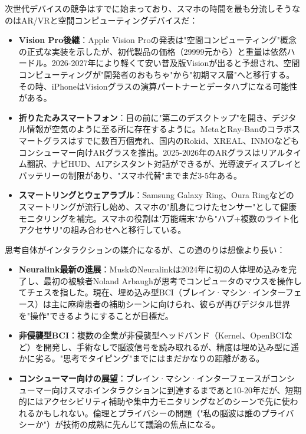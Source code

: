 


次世代デバイスの競争はすでに始まっており、スマホの時間を最も分流しそうなのはAR/VRと空間コンピューティングデバイスだ：

\begin{itemize}
  \item \textbf{Vision Pro後継}：Apple Vision Proの発表は"空間コンピューティング"概念の正式な実装を示したが、初代製品の価格（29999元から）と重量は依然ハードル。2026-2027年により軽くて安い普及版Visionが出ると予想され、空間コンピューティングが"開発者のおもちゃ"から"初期マス層"へと移行する。その時、iPhoneはVisionグラスの演算パートナーとデータハブになる可能性がある。
  \item \textbf{折りたたみスマートフォン}：目の前に"第二のデスクトップ"を開き、デジタル情報が空気のように至る所に存在するように。MetaとRay-Banのコラボスマートグラスはすでに数百万個売れ、国内のRokid、XREAL、INMOなどもコンシューマー向けARグラスを推出。2025-2026年のARグラスはリアルタイム翻訳、ナビHUD、AIアシスタント対話ができるが、光導波ディスプレイとバッテリーの制限があり、"スマホ代替"までまだ3-5年ある。
  \item \textbf{スマートリングとウェアラブル}：Samsung Galaxy Ring、Oura Ringなどのスマートリングが流行し始め、スマホの"肌身につけたセンサー"として健康モニタリングを補完。スマホの役割は"万能端末"から"ハブ+複数のライト化アクセサリ"の組み合わせへと移行している。
\end{itemize}


思考自体がインタラクションの媒介になるが、この道のりは想像より長い：

\begin{itemize}
  \item \textbf{Neuralink最新の進展}：MuskのNeuralinkは2024年に初の人体埋め込みを完了し、最初の被験者Noland Arbaughが思考でコンピュータのマウスを操作してチェスを指した。現在、埋め込み型BCI（ブレイン·マシン·インターフェース）は主に麻痺患者の補助シーンに向けられ、彼らが再びデジタル世界を"操作"できるようにすることが目標だ。
  \item \textbf{非侵襲型BCI}：複数の企業が非侵襲型ヘッドバンド（Kernel、OpenBCIなど）を開発し、手術なしで脳波信号を読み取れるが、精度は埋め込み型に遥かに劣る。"思考でタイピング"までにはまだかなりの距離がある。
  \item \textbf{コンシューマー向けの展望}：ブレイン·マシン·インターフェースがコンシューマー向けスマホインタラクションに到達するまであと10-20年だが、短期的にはアクセシビリティ補助や集中力モニタリングなどのシーンで先に使われるかもしれない。倫理とプライバシーの問題（"私の脳波は誰のプライバシーか"）が技術の成熟に先んじて議論の焦点になる。
\end{itemize}

